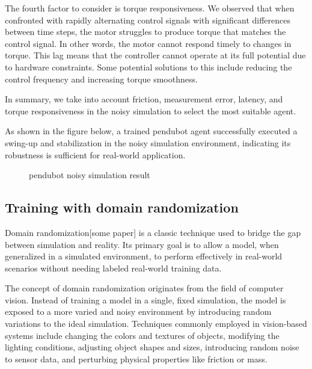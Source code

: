 The fourth factor to consider is torque responsiveness. We observed that when confronted with rapidly alternating control signals with significant differences between time steps, the motor struggles to produce torque that matches the control signal. In other words, the motor cannot respond timely to changes in torque. This lag means that the controller cannot operate at its full potential due to hardware constraints. Some potential solutions to this include reducing the control frequency and increasing torque smoothness.

In summary, we take into account friction, measurement error, latency, and torque responsiveness in the noisy simulation to select the most suitable agent.

As shown in the figure below, a trained pendubot agent successfully executed a swing-up and stabilization in the noisy simulation environment, indicating its robustness is sufficient for real-world application.

\begin{figure}[htbp]
    \centering
    \caption{pendubot noisy simulation result}
    \label{fig:image_b}
\end{figure}

\subsection{Training with domain randomization}
Domain randomization[some paper] is a classic technique used to bridge the gap between simulation and reality. Its primary goal is to allow a model, when generalized in a simulated environment, to perform effectively in real-world scenarios without needing labeled real-world training data.

The concept of domain randomization originates from the field of computer vision. Instead of training a model in a single, fixed simulation, the model is exposed to a more varied and noisy environment by introducing random variations to the ideal simulation. Techniques commonly employed in vision-based systems include changing the colors and textures of objects, modifying the lighting conditions, adjusting object shapes and sizes, introducing random noise to sensor data, and perturbing physical properties like friction or mass.

